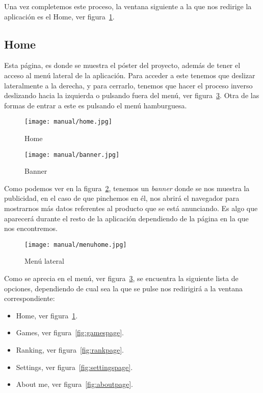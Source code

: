 Una vez completemos este proceso, la ventana siguiente a la que nos redirige la aplicación es el Home, ver figura~\ref{fig:homepage}.


\subsection{Home}\label{home}
Esta página, es donde se muestra el póster del proyecto, además de tener el acceso al menú lateral de la aplicación. Para acceder a este tenemos que deslizar lateralmente a la derecha, y para cerrarlo, tenemos que hacer el proceso inverso deslizando hacia la izquierda o pulsando fuera del menú, ver figura~\ref{fig:menuhome}. Otra de las formas de entrar a este es pulsando el menú hamburguesa.

\begin{figure}[H]
	\centering
	\texttt{[image: manual/home.jpg]}
	\caption{Home}\label{fig:homepage}
\end{figure}

\begin{figure}[H]
	\centering
	\texttt{[image: manual/banner.jpg]}
	\caption{Banner}\label{fig:banner}
\end{figure}

Como podemos ver en la figura~\ref{fig:banner}, tenemos un \emph{banner} donde se nos muestra la publicidad, en el caso de que pinchemos en él, nos abrirá el navegador para mostrarnos más datos referentes al producto que se está anunciando. Es algo que aparecerá durante el resto de la aplicación dependiendo de la página en la que nos encontremos.

\begin{figure}[H]
	\centering
	\texttt{[image: manual/menuhome.jpg]}
	\caption{Menú lateral}\label{fig:menuhome}
\end{figure}
 
Como se aprecia en el menú, ver figura~\ref{fig:menuhome},  se encuentra la siguiente lista de opciones, dependiendo de cual sea la que se pulse nos redirigirá a la ventana correspondiente:

\begin{itemize}
	\item Home, ver figura~\ref{fig:homepage}.
	\item Games, ver figura~\ref{fig:gamespage}.
	\item Ranking, ver figura~\ref{fig:rankpage}.
	\item Settings, ver figura~\ref{fig:settingspage}.
	\item About me, ver figura~\ref{fig:aboutpage}.
\end{itemize}

